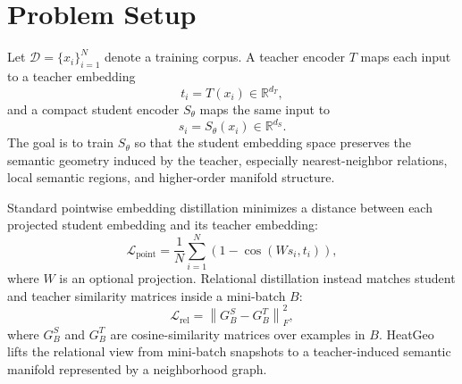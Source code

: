 \section{Problem Setup}

Let $\mathcal{D}=\{x_i\}_{i=1}^{N}$ denote a training corpus. A teacher encoder $T$ maps each input to a teacher embedding
\begin{equation}
    t_i = T(x_i) \in \mathbb{R}^{d_T},
\end{equation}
and a compact student encoder $S_{\theta}$ maps the same input to
\begin{equation}
    s_i = S_{\theta}(x_i) \in \mathbb{R}^{d_S}.
\end{equation}
The goal is to train $S_{\theta}$ so that the student embedding space preserves the semantic geometry induced by the teacher, especially nearest-neighbor relations, local semantic regions, and higher-order manifold structure.

Standard pointwise embedding distillation minimizes a distance between each projected student embedding and its teacher embedding:
\begin{equation}
    \mathcal{L}_{\mathrm{point}}
    =
    \frac{1}{N}
    \sum_{i=1}^{N}
    \left(1-\cos(Ws_i,t_i)\right),
\end{equation}
where $W$ is an optional projection. Relational distillation instead matches student and teacher similarity matrices inside a mini-batch $B$:
\begin{equation}
    \mathcal{L}_{\mathrm{rel}}
    =
    \left\|
    G_B^S - G_B^T
    \right\|_F^2,
\end{equation}
where $G_B^S$ and $G_B^T$ are cosine-similarity matrices over examples in $B$. HeatGeo lifts the relational view from mini-batch snapshots to a teacher-induced semantic manifold represented by a neighborhood graph.
